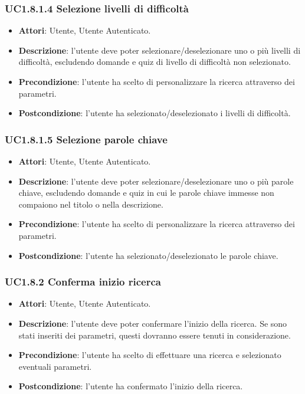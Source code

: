 \subsubsection{UC1.8.1.4 Selezione livelli di difficoltà}
\begin{itemize}
\item \textbf{Attori}: Utente, Utente Autenticato.
\item \textbf{Descrizione}: l'utente deve poter selezionare/deselezionare uno o più livelli di difficoltà, escludendo domande e quiz di livello di difficoltà non selezionato.
\item \textbf{Precondizione}: l'utente ha scelto di personalizzare la ricerca attraverso dei parametri.
\item \textbf{Postcondizione}: l'utente ha selezionato/deselezionato i livelli di difficoltà.
\end{itemize}
\subsubsection{UC1.8.1.5 Selezione parole chiave}
\begin{itemize}
\item \textbf{Attori}: Utente, Utente Autenticato.
\item \textbf{Descrizione}: l'utente deve poter selezionare/deselezionare uno o più parole chiave, escludendo domande e quiz in cui le parole chiave immesse non compaiono nel titolo o nella descrizione.
\item \textbf{Precondizione}: l'utente ha scelto di personalizzare la ricerca attraverso dei parametri.
\item \textbf{Postcondizione}: l'utente ha selezionato/deselezionato le parole chiave.
\end{itemize}
\subsubsection{UC1.8.2 Conferma inizio ricerca}
\begin{itemize}
\item \textbf{Attori}: Utente, Utente Autenticato.
\item \textbf{Descrizione}: l'utente deve poter confermare l'inizio della ricerca. Se sono stati inseriti dei parametri, questi dovranno essere tenuti in considerazione.
\item \textbf{Precondizione}: l'utente ha scelto di effettuare una ricerca e selezionato eventuali parametri.
\item \textbf{Postcondizione}: l'utente ha confermato l'inizio della ricerca.
\end{itemize}
